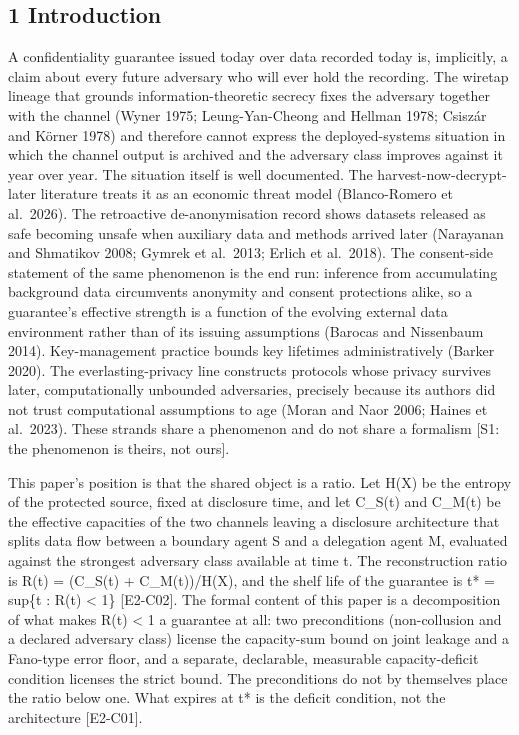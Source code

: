 \documentclass[
  11pt,
]{article}
\begin{document}
\subsection{1 Introduction}\label{introduction}

A confidentiality guarantee issued today over data recorded today is,
implicitly, a claim about every future adversary who will ever hold the
recording. The wiretap lineage that grounds information-theoretic
secrecy fixes the adversary together with the channel (Wyner 1975;
Leung-Yan-Cheong and Hellman 1978; Csiszár and Körner 1978) and
therefore cannot express the deployed-systems situation in which the
channel output is archived and the adversary class improves against it
year over year. The situation itself is well documented. The
harvest-now-decrypt-later literature treats it as an economic threat
model (Blanco-Romero et al.~2026). The retroactive de-anonymisation
record shows datasets released as safe becoming unsafe when auxiliary
data and methods arrived later (Narayanan and Shmatikov 2008; Gymrek et
al.~2013; Erlich et al.~2018). The consent-side statement of the same
phenomenon is the end run: inference from accumulating background data
circumvents anonymity and consent protections alike, so a guarantee's
effective strength is a function of the evolving external data
environment rather than of its issuing assumptions (Barocas and
Nissenbaum 2014). Key-management practice bounds key lifetimes
administratively (Barker 2020). The everlasting-privacy line constructs
protocols whose privacy survives later, computationally unbounded
adversaries, precisely because its authors did not trust computational
assumptions to age (Moran and Naor 2006; Haines et al.~2023). These
strands share a phenomenon and do not share a formalism {[}S1: the
phenomenon is theirs, not ours{]}.

This paper's position is that the shared object is a ratio. Let H(X) be
the entropy of the protected source, fixed at disclosure time, and let
C\_S(t) and C\_M(t) be the effective capacities of the two channels
leaving a disclosure architecture that splits data flow between a
boundary agent S and a delegation agent M, evaluated against the
strongest adversary class available at time t. The reconstruction ratio
is R(t) = (C\_S(t) + C\_M(t))/H(X), and the shelf life of the guarantee
is t* = sup\{t : R(t) \textless{} 1\} {[}E2-C02{]}. The formal content
of this paper is a decomposition of what makes R(t) \textless{} 1 a
guarantee at all: two preconditions (non-collusion and a declared
adversary class) license the capacity-sum bound on joint leakage and a
Fano-type error floor, and a separate, declarable, measurable
capacity-deficit condition licenses the strict bound. The preconditions
do not by themselves place the ratio below one. What expires at t* is
the deficit condition, not the architecture {[}E2-C01{]}.
\end{document}
